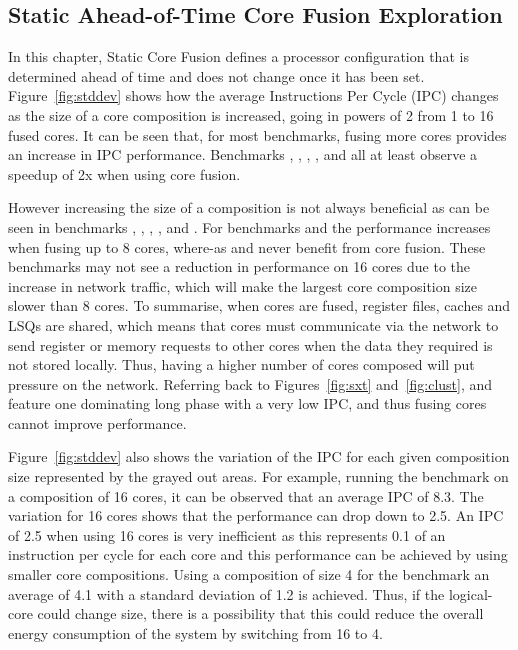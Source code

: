 \subsection{Static Ahead-of-Time Core Fusion Exploration}

In this chapter, Static Core Fusion defines a processor configuration that is determined ahead of time and does not change once it has been set.
Figure~\ref{fig:stddev} shows how the average Instructions Per Cycle (IPC) changes as the size of a core composition is increased, going in powers of 2 from 1 to 16 fused cores.
It can be seen that, for most benchmarks, fusing more cores provides an increase in IPC performance.
Benchmarks , , , ,  and  all at least observe a speedup of 2x when using core fusion.

However increasing the size of a composition is not always beneficial as can be seen in benchmarks , , , , and .
For benchmarks  and  the performance increases when fusing up to 8 cores, where-as  and  never benefit from core fusion.
These benchmarks may not see a reduction in performance on 16 cores due to the increase in network traffic, which will make the largest core composition size slower than 8 cores.
To summarise, when cores are fused, register files, caches and LSQs are shared, which means that cores must communicate via the network to send register or memory requests to other cores when the data they required is not stored locally.
Thus, having a higher number of cores composed will put pressure on the network.
Referring back to Figures~\ref{fig:sxt} and~\ref{fig:clust},  and  feature one dominating long phase with a very low IPC, and thus fusing cores cannot improve performance.

Figure~\ref{fig:stddev} also shows the variation of the IPC for each given composition size represented by the grayed out areas.
For example, running the  benchmark on a composition of 16 cores, it can be observed that an average IPC of 8.3.
The variation for 16 cores shows that the performance can drop down to 2.5.
An IPC of 2.5 when using 16 cores is very inefficient as this represents 0.1 of an instruction per cycle for each core and this performance can be achieved by using smaller core compositions.
Using a composition of size 4 for the  benchmark an average of 4.1 with a standard deviation of 1.2 is achieved.
Thus, if the logical-core could change size, there is a possibility that this could reduce the overall energy consumption of the system by switching from 16 to 4.

